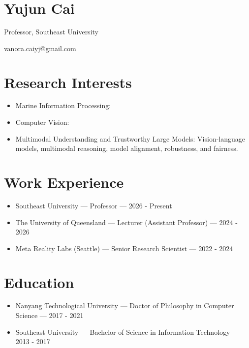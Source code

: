 \section*{Yujun Cai}
Professor, Southeast University

vanora.caiyj@gmail.com

\section*{Research Interests}
\begin{itemize}
\item Marine Information Processing: 
\item Computer Vision: 
\item Multimodal Understanding and Trustworthy Large Models: Vision-language models, multimodal reasoning, model alignment, robustness, and fairness.
\end{itemize}
\section*{Work Experience}
\begin{itemize}
\item Southeast University — Professor — 2026 - Present
\item The University of Queensland — Lecturer (Assistant Professor) — 2024 - 2026
\item Meta Reality Labs (Seattle) — Senior Research Scientist — 2022 - 2024
\end{itemize}
\section*{Education}
\begin{itemize}
\item Nanyang Technological University — Doctor of Philosophy in Computer Science — 2017 - 2021
\item Southeast University — Bachelor of Science in Information Technology — 2013 - 2017
\end{itemize}
